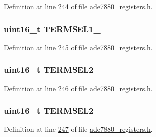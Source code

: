 Definition at line \hyperlink{a00036_source_l00244}{244} of file \hyperlink{a00036_source}{ade7880\-\_\-registers.\-h}.

\hypertarget{a00021_ab907591a01325a0270cb9f9e6f83cc00}{
\subsubsection[{T\-E\-R\-M\-S\-E\-L1\-\_\-2}]{\setlength{\rightskip}{0pt plus 5cm}uint16\-\_\-t T\-E\-R\-M\-S\-E\-L1\-\_}}\label{de/d11/a00021_ab907591a01325a0270cb9f9e6f83cc00}


Definition at line \hyperlink{a00036_source_l00245}{245} of file \hyperlink{a00036_source}{ade7880\-\_\-registers.\-h}.

\hypertarget{a00021_aeb9fb2bff5216fa9849b875862ed23ec}{
\subsubsection[{T\-E\-R\-M\-S\-E\-L2\-\_\-0}]{\setlength{\rightskip}{0pt plus 5cm}uint16\-\_\-t T\-E\-R\-M\-S\-E\-L2\-\_}}\label{de/d11/a00021_aeb9fb2bff5216fa9849b875862ed23ec}


Definition at line \hyperlink{a00036_source_l00246}{246} of file \hyperlink{a00036_source}{ade7880\-\_\-registers.\-h}.

\hypertarget{a00021_aa919a8f7b4bd25c24e2a204b38f3d01d}{
\subsubsection[{T\-E\-R\-M\-S\-E\-L2\-\_\-1}]{\setlength{\rightskip}{0pt plus 5cm}uint16\-\_\-t T\-E\-R\-M\-S\-E\-L2\-\_}}\label{de/d11/a00021_aa919a8f7b4bd25c24e2a204b38f3d01d}


Definition at line \hyperlink{a00036_source_l00247}{247} of file \hyperlink{a00036_source}{ade7880\-\_\-registers.\-h}.

